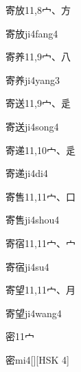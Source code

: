 \begin{entry}{寄放}{11,8}{⼧、⽅}
  \begin{phonetics}{寄放}{ji4fang4}
  \end{phonetics}
\end{entry}

\begin{entry}{寄养}{11,9}{⼧、⼋}
  \begin{phonetics}{寄养}{ji4yang3}
  \end{phonetics}
\end{entry}

\begin{entry}{寄送}{11,9}{⼧、⾡}
  \begin{phonetics}{寄送}{ji4song4}
  \end{phonetics}
\end{entry}

\begin{entry}{寄递}{11,10}{⼧、⾡}
  \begin{phonetics}{寄递}{ji4di4}
  \end{phonetics}
\end{entry}

\begin{entry}{寄售}{11,11}{⼧、⼝}
  \begin{phonetics}{寄售}{ji4shou4}
  \end{phonetics}
\end{entry}

\begin{entry}{寄宿}{11,11}{⼧、⼧}
  \begin{phonetics}{寄宿}{ji4su4}
  \end{phonetics}
\end{entry}

\begin{entry}{寄望}{11,11}{⼧、⽉}
  \begin{phonetics}{寄望}{ji4wang4}
  \end{phonetics}
\end{entry}

\begin{entry}{密}{11}{⼧}
  \begin{phonetics}{密}{mi4}[][HSK 4]
  \end{phonetics}
\end{entry}

